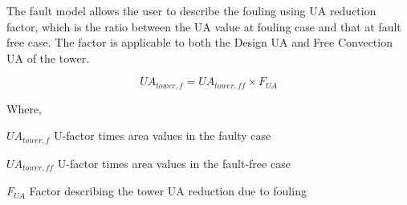 The fault model allows the user to describe the fouling using UA reduction factor, which is the ratio between the UA value at fouling case and that at fault free case. The factor is applicable to both the Design UA and Free Convection UA of the tower. 

\begin{equation}
UA_{tower,f} = UA_{tower,ff} \times F_{UA}
\end{equation}

Where,

\(UA_{tower,f}\) U-factor times area values in the faulty case

\(UA_{tower,ff}\) U-factor times area values in the fault-free case

\(F_{UA}\) Factor describing the tower UA reduction due to fouling

